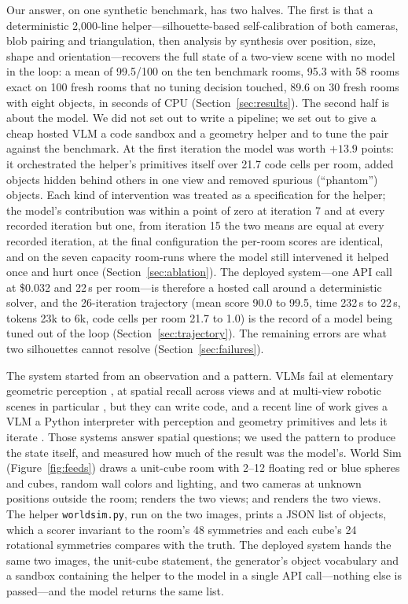 \documentclass[10pt,a4paper]{article}
\newcommand{\ws}{World Sim}
\newcommand{\helper}{\texttt{worldsim.py}}
\begin{document}
Our answer, on one synthetic benchmark, has two halves. The first is that a deterministic 2,000-line helper---silhouette-based self-calibration of both cameras, blob pairing and triangulation, then analysis by synthesis over position, size, shape and orientation---recovers the full state of a two-view scene with no model in the loop: a mean of 99.5/100 on the ten benchmark rooms, 95.3 with 58 rooms exact on 100 fresh rooms that no tuning decision touched, 89.6 on 30 fresh rooms with eight objects, in seconds of CPU (Section~\ref{sec:results}). The second half is about the model. We did not set out to write a pipeline; we set out to give a cheap hosted VLM a code sandbox and a geometry helper and to tune the pair against the benchmark. At the first iteration the model was worth $+13.9$ points: it orchestrated the helper's primitives itself over 21.7 code cells per room, added objects hidden behind others in one view and removed spurious (``phantom'') objects. Each kind of intervention was treated as a specification for the helper; the model's contribution was within a point of zero at iteration 7 and at every recorded iteration but one, from iteration 15 the two means are equal at every recorded iteration, at the final configuration the per-room scores are identical, and on the seven capacity room-runs where the model still intervened it helped once and hurt once (Section~\ref{sec:ablation}). The deployed system---one API call at \$0.032 and 22\,s per room---is therefore a hosted call around a deterministic solver, and the 26-iteration trajectory (mean score 90.0 to 99.5, time 232\,s to 22\,s, tokens 23k to 6k, code cells per room 21.7 to 1.0) is the record of a model being tuned out of the loop (Section~\ref{sec:trajectory}). The remaining errors are what two silhouettes cannot resolve (Section~\ref{sec:failures}).

The system started from an observation and a pattern. VLMs fail at elementary geometric perception \citep{rahmanzadehgervi2024vision}, at spatial recall across views \citep{yang2024thinking} and at multi-view robotic scenes in particular \citep{feng2025seeing}, but they can write code, and a recent line of work gives a VLM a Python interpreter with perception and geometry primitives and lets it iterate \citep{gupta2022visual,surs2023vipergpt,hu2024visual,marsili2025visual,cho2026spatialclaw,luo2026pyspatial}. Those systems answer spatial questions; we used the pattern to produce the state itself, and measured how much of the result was the model's. \ws{} (Figure~\ref{fig:feeds}) draws a unit-cube room with 2--12 floating red or blue spheres and cubes, random wall colors and lighting, and two cameras at unknown positions outside the room; renders the two views; and renders the two views. The helper \helper{}, run on the two images, prints a JSON list of objects, which a scorer invariant to the room's 48 symmetries and each cube's 24 rotational symmetries compares with the truth. The deployed system hands the same two images, the unit-cube statement, the generator's object vocabulary and a sandbox containing the helper to the model in a single API call---nothing else is passed---and the model returns the same list.
\end{document}
